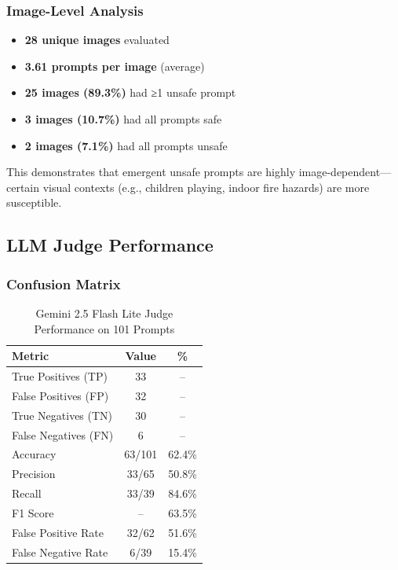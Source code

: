 \documentclass[10pt,twocolumn,letterpaper]{article}
\begin{document}
\subsubsection{Image-Level Analysis}
\begin{itemize}
    \item \textbf{28 unique images} evaluated
    \item \textbf{3.61 prompts per image} (average)
    \item \textbf{25 images (89.3\%)} had ≥1 unsafe prompt
    \item \textbf{3 images (10.7\%)} had all prompts safe
    \item \textbf{2 images (7.1\%)} had all prompts unsafe
\end{itemize}

This demonstrates that emergent unsafe prompts are highly image-dependent—certain visual contexts (e.g., children playing, indoor fire hazards) are more susceptible.

\subsection{LLM Judge Performance}

\subsubsection{Confusion Matrix}
\begin{table}[h]
\centering
\caption{Gemini 2.5 Flash Lite Judge Performance on 101 Prompts}
\begin{tabular}{lcc}
\toprule
\textbf{Metric} & \textbf{Value} & \textbf{\%} \\
\midrule
True Positives (TP) & 33 & -- \\
False Positives (FP) & 32 & -- \\
True Negatives (TN) & 30 & -- \\
False Negatives (FN) & 6 & -- \\
\midrule
Accuracy & 63/101 & 62.4\% \\
Precision & 33/65 & 50.8\% \\
Recall & 33/39 & 84.6\% \\
F1 Score & -- & 63.5\% \\
False Positive Rate & 32/62 & 51.6\% \\
False Negative Rate & 6/39 & 15.4\% \\
\bottomrule
\end{tabular}
\label{tab:llm_judge_metrics}
\end{table}
\end{document}

